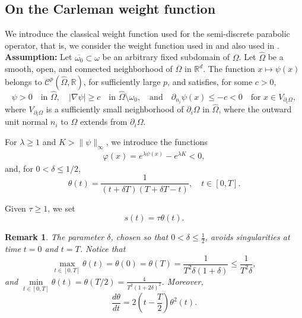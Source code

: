 \documentclass{amsart}
\numberwithin{equation}{section}
\newtheorem{remark}[theorem]{Remark}
\begin{document}
\subsection{On the Carleman weight function}
We introduce the classical weight function used for the semi-discrete parabolic operator, that is, we consider the weight function used in \cite{BLR-2014} and also used in \cite{BHS2020,CLNP2022,GCHS2021,HS2023,LMZP2023}.\\
\textbf{Assumption:} Let $\overline{\omega_0}\subset \omega$ be an arbitrary fixed subdomain of $\Omega$. Let $\widehat{\Omega}$ be a smooth, open, and connected neighborhood of $\overline{\Omega}$ in $\mathbb{R}^d$. The function $x \mapsto \psi(x)$ belongs to $\mathcal{C}^p(\widehat{\Omega}, \mathbb{R})$, for sufficiently large $p$, and satisfies, for some $c > 0$,
\begin{equation}\label{assumtion:psi}
\psi > 0 \quad \text{in } \widehat{\Omega}, \quad |\nabla \psi| \geq c \quad \text{in } \widehat{\Omega} \setminus \omega_0, \quad \text{and} \quad \partial_{n_i} \psi(x) \leq -c < 0 \quad \text{for } x \in V_{\partial_i \Omega},
\end{equation}
where $V_{\partial_i \Omega}$ is a sufficiently small neighborhood of $\partial_i \Omega$ in $\widehat{\Omega}$, where the outward unit normal $n_i$ to $\Omega$  extends from $\partial_i \Omega$. 


For $\lambda\geq 1$ and $K>\|\psi\|_{\infty}$, we introduce the functions
\begin{align}\label{funcion-peso-2}
\varphi(x)=e^{\lambda\psi(x)}-e^{\lambda K}<0,
\end{align}
 and, for $0<\delta \leq 1/2$,
\begin{equation}\label{theta-delta}
    \theta(t)=\frac{1}{(t+\delta T)(T+\delta T-t)},\quad t\in [0,T].
\end{equation}

Given $\tau\geq 1$, we set
\begin{equation}\label{eq1}
s(t)=\tau\theta(t).
\end{equation}

\begin{remark}
The parameter $\delta$, chosen so that $0<\delta\leq\frac{1}{2}$, avoids singularities at time $t=0$ and $t=T$. Notice that
\begin{equation}\label{eq:theta} 
\underset{t\in [0,T]}{\max} \theta(t)=\theta(0)=\theta(T)=\frac{1}{T^{2}\delta(1+\delta)}\leq \frac{1}{T^{2}\delta}, 
\end{equation}
and $\underset{t\in[0,T]}{\min}\theta(t)= \theta(T/2)=\frac{4}{T^{2}(1+2\delta)^2}$. Moreover,
\begin{equation}\label{eq:theta'}\frac{d\theta}{dt}=2\left(t-\frac{T}{2}\right)\theta^2(t).
\end{equation}
\end{remark}
\end{document}
